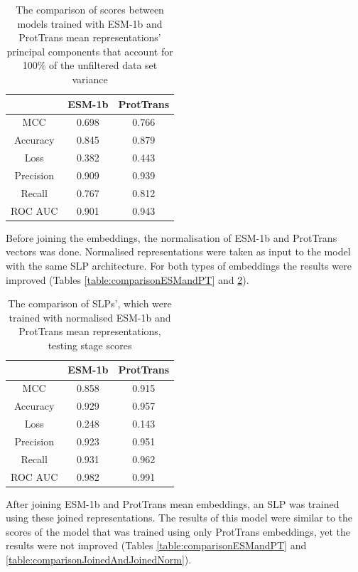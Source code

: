 \documentclass[12pt]{article}
\begin{document}
	\begin{table}[h!]
		\caption{The comparison of scores between models trained with ESM-1b
		and ProtTrans mean representations' principal components 
		that account for 100\% of the unfiltered data set variance}
		\vspace{0.2cm}
		\centering
		\begin{tabular}{ | c | c c | }
			\hline 
						
			& ESM-1b & ProtTrans \\
			\hline 
			MCC & 0.698 & 0.766 \\
			Accuracy & 0.845 & 0.879 \\
			Loss & 0.382 & 0.443 \\
			Precision & 0.909 & 0.939 \\
			Recall & 0.767 & 0.812 \\
			ROC AUC & 0.901 & 0.943 \\
			\hline    
		\end{tabular}
		\label{table:comparisonESMandPTPC100}
	\end{table}

	Before joining the embeddings, the normalisation of ESM-1b and ProtTrans 
	vectors was done. Normalised representations were taken as input to 
	the model with the same SLP architecture. For both types of embeddings 
	the results were improved (Tables \ref{table:comparisonESMandPT} and
	\ref{table:normalisedESMAndPTScores}).

	\begin{table}[h!]
		\caption{The comparison of SLPs', which were 
		trained with normalised ESM-1b and ProtTrans mean 
		representations, testing stage scores}
		\vspace{0.2cm}
		\centering
		\begin{tabular}{ | c | c c | }
			\hline 	
			& ESM-1b & ProtTrans \\
			\hline 
			MCC & 0.858 & 0.915 \\
			Accuracy & 0.929 & 0.957 \\
			Loss & 0.248 & 0.143 \\
			Precision & 0.923 & 0.951 \\
			Recall & 0.931 & 0.962 \\
			ROC AUC & 0.982 & 0.991 \\
			\hline    
		\end{tabular}
		\label{table:normalisedESMAndPTScores}
	\end{table}

	After joining ESM-1b and ProtTrans mean embeddings, an SLP was trained 
	using these joined representations. The results of this model were similar 
	to the scores of the model that was trained using only ProtTrans embeddings, 
	yet the results 
	were not improved (Tables \ref{table:comparisonESMandPT} and 
	\ref{table:comparisonJoinedAndJoinedNorm}). 
\end{document}
